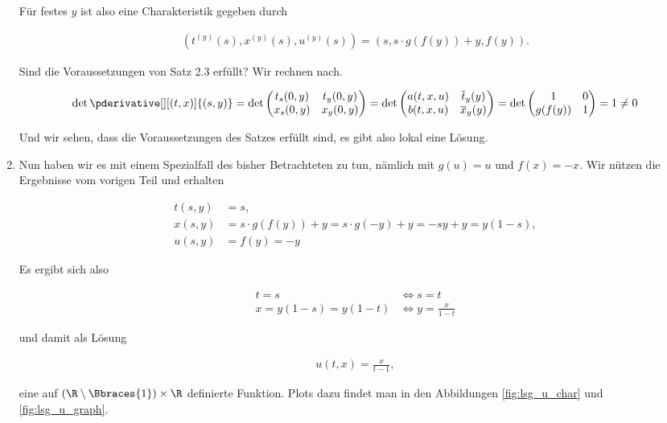 \begin{solution}
\begin{enumerate}[label = (\roman*)]
	Für festes $y$ ist also eine Charakteristik gegeben durch

	\begin{align*}
		(t^{(y)}(s), x^{(y)}(s), u^{(y)}(s))
		=
		(s, s \cdot g(f(y)) + y, f(y)).
	\end{align*}

	Sind die Voraussetzungen von Satz 2.3 erfüllt? Wir rechnen nach.

	\begin{align*}
		\det \pderivative[][(t,x)]{(s,y)} = \det
		\begin{pmatrix}
			t_s(0,y) & t_y(0,y) \\
			x_s(0,y) & x_y(0,y)
		\end{pmatrix}
		=
		\det
		\begin{pmatrix}
			a(t, x, u) & \overline{t}_y(y) \\
			b(t, x, u) & \overline{x}_y(y)
		\end{pmatrix}
		=
		\det
		\begin{pmatrix}
			1 & 0 \\
			g(f(y)) & 1
		\end{pmatrix}
		= 1 \neq 0
	\end{align*}

	Und wir sehen, dass die Voraussetzungen des Satzes erfüllt sind, es gibt also lokal eine Lösung.

	\item Nun haben wir es mit einem Spezialfall des bisher Betrachteten zu tun, nämlich mit $g(u) = u$ und $f(x) = -x$. Wir nützen die Ergebnisse vom vorigen Teil und erhalten

	\begin{align*}
		t(s,y) & = s, \\
		x(s,y) & = s \cdot g(f(y)) + y = s \cdot g(-y) + y = -sy + y = y(1 - s), \\
		u(s,y) & = f(y) = -y
	\end{align*}

	Es ergibt sich also

	\begin{align*}
		t = s
		& \iff
		s = t \\
		x = y(1 - s) = y(1 - t)
		& \iff
		y = \frac{x}{1 - t}
	\end{align*}

	und damit als Lösung

	\begin{align*}
		u(t,x) = \frac{x}{t - 1},
	\end{align*}

	eine auf $(\R \setminus \Bbraces{1}) \times \R$ definierte Funktion.
	Plots dazu findet man in den Abbildungen \ref{fig:lsg_u_char} und \ref{fig:lsg_u_graph}.


\end{enumerate}
\end{solution}

